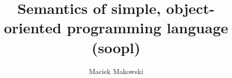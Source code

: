 \documentclass[11pt,a4paper,twoside]{article}
\title{Semantics of simple, object-oriented programming language (soopl)}
\author{Maciek Makowski}
\begin{document}
\newcommand{\Slet}{\mathsf{let\;}}
\newcommand{\Sin}{\mathsf{\;in\;}}
\newcommand{\Sif}{\mathsf{\;if\;}}
\newcommand{\Sthen}{\mathsf{\;then\;}}
\newcommand{\Selse}{\mathsf{\;else\;}}
\newcommand{\Shd}{\mathsf{hd}\,}
\newcommand{\Stl}{\mathsf{tl}\,}
\newcommand{\Sappend}{\mathsf{append}\,}
\newcommand{\Stab}{\mathtt{\;\;\;\;\;\;\;\;\;\;\;\;}}
\newcommand{\SM}{\mathcal{M}}

\newcommand{\Salloc}{\mathsf{alloc}\,}
\newcommand{\Smakeenv}{\mathsf{makeenv}\,}
\newcommand{\Senvcomb}{\mathsf{envcomb}\,}
\newcommand{\Senvcast}{\mathsf{envcast}\,}
\newcommand{\Senvidcast}{\mathsf{envidcast}\,}
\newcommand{\Sinlist}{\mathsf{inlist}\,}

\newcommand{\Sunbound}{\mathrm{unbound}}
\newcommand{\Sempty}{\mathrm{empty}}
\newcommand{\Sreturn}{\mathrm{return}}
\newcommand{\Sself}{\mathrm{self}}
\newcommand{\Sroot}{\mathrm{Root}}

\maketitle
\end{document}
